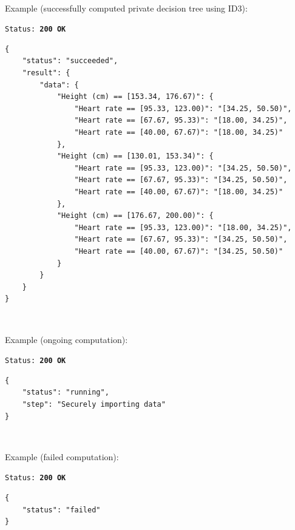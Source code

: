 \begin{itemize}
\begin{description}[labelwidth=4em, leftmargin=\dimexpr\labelwidth+\labelsep\relax]
\ \\
\begin{minipage}{\linewidth}
  Example (successfully computed private decision tree using ID3):\\
{
\texttt{Status: {\color{ForestGreen}\textbf{200 OK}}}
\begin{verbatim}
{
    "status": "succeeded",
    "result": {
        "data": {
            "Height (cm) == [153.34, 176.67)": {
                "Heart rate == [95.33, 123.00)": "[34.25, 50.50)",
                "Heart rate == [67.67, 95.33)": "[18.00, 34.25)",
                "Heart rate == [40.00, 67.67)": "[18.00, 34.25)"
            },
            "Height (cm) == [130.01, 153.34)": {
                "Heart rate == [95.33, 123.00)": "[34.25, 50.50)",
                "Heart rate == [67.67, 95.33)": "[34.25, 50.50)",
                "Heart rate == [40.00, 67.67)": "[18.00, 34.25)"
            },
            "Height (cm) == [176.67, 200.00)": {
                "Heart rate == [95.33, 123.00)": "[18.00, 34.25)",
                "Heart rate == [67.67, 95.33)": "[34.25, 50.50)",
                "Heart rate == [40.00, 67.67)": "[34.25, 50.50)"
            }
        }
    }
}
\end{verbatim}
\label{sc:get-response-sucessful-4}
}
\end{minipage}

\ \\
\begin{minipage}{\linewidth}
  Example (ongoing computation):\\
{
\texttt{Status: {\color{ForestGreen}\textbf{200 OK}}}
\begin{verbatim}
{
    "status": "running",
    "step": "Securely importing data"
}
\end{verbatim}
\label{sc:get-response-running}
}
\end{minipage}

\ \\
\begin{minipage}{\linewidth}
  Example (failed computation):\\
{
\texttt{Status: {\color{ForestGreen}\textbf{200 OK}}}
\begin{verbatim}
{
    "status": "failed"
}
\end{verbatim}
\label{sc:get-response-failed}
}
\end{minipage}


\end{description}
\end{itemize}



